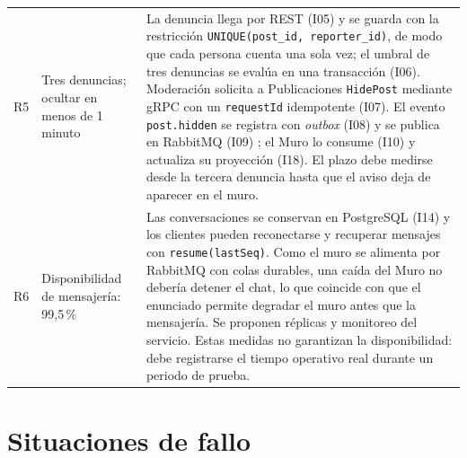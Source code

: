 \documentclass[12pt,a4paper]{article}
\begin{document}
\begin{longtable}{@{}p{0.9cm}p{4cm}p{9.6cm}@{}}
R5 &
Tres denuncias; ocultar en menos de 1 minuto &
La denuncia llega por REST (I05) y se guarda con la restricción
\texttt{UNIQUE(post\_id, reporter\_id)}, de modo que cada persona cuenta una
sola vez; el umbral de tres denuncias se evalúa en una transacción (I06).
Moderación solicita a Publicaciones \texttt{HidePost} mediante gRPC con un
\texttt{requestId} idempotente (I07). El evento \texttt{post.hidden} se
registra con \textit{outbox} (I08) y se publica en RabbitMQ (I09)
\cite{schwarz2025outbox}; el Muro lo consume (I10) y actualiza su proyección
(I18). El plazo debe medirse desde la tercera denuncia hasta que el aviso
deja de aparecer en el muro. \\

R6 &
Disponibilidad de mensajería: 99,5\,\% &
Las conversaciones se conservan en PostgreSQL (I14) y los clientes pueden
reconectarse y recuperar mensajes con \texttt{resume(lastSeq)}. Como el muro
se alimenta por RabbitMQ con colas durables, una caída del Muro no debería
detener el chat, lo que coincide con que el enunciado permite degradar el muro
antes que la mensajería. Se proponen réplicas y monitoreo del servicio. Estas
medidas no garantizan la disponibilidad: debe registrarse el tiempo operativo
real durante un periodo de prueba. \\

\bottomrule
\end{longtable}
\endgroup

\section{Situaciones de fallo}
\end{document}
